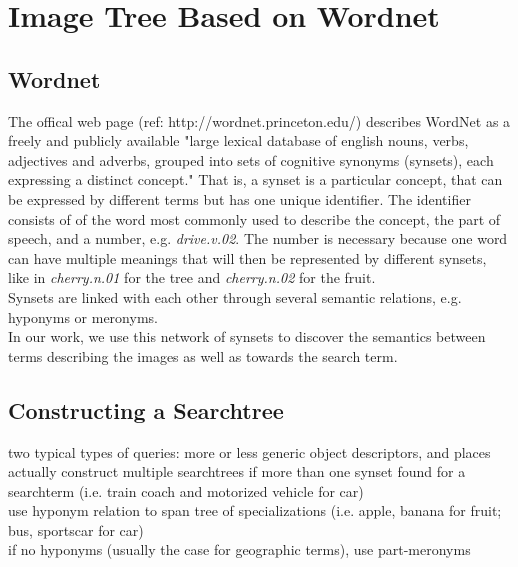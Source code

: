 %
\section{Image Tree Based on Wordnet}
\label{sec_wordnetsearchtree}

\subsection{Wordnet}
The offical web page (ref: http://wordnet.princeton.edu/) describes WordNet as a freely and publicly available "large lexical database of english nouns, verbs, adjectives and adverbs, grouped into sets of cognitive synonyms (synsets), each expressing a distinct concept." That is, a synset is a particular concept, that can be expressed by different terms but has one unique identifier. The identifier consists of of the word most commonly used to describe the concept, the part of speech, and a number, e.g. \emph{drive.v.02}.
The number is necessary because one word can have multiple meanings that will then be represented by different synsets, like in \emph{cherry.n.01} for the tree and \emph{cherry.n.02} for the fruit. \\

Synsets are linked with each other through several semantic relations, e.g. hyponyms or meronyms. \\
In our work, we use this network of synsets to discover the semantics between terms describing the images as well as towards the search term. \\
  

\subsection{Constructing a Searchtree}
two typical types of queries: more or less generic object descriptors, and places \\
actually construct multiple searchtrees if more than one synset found for a searchterm (i.e. train coach and motorized vehicle for car)\\
use hyponym relation to span tree of specializations (i.e. apple, banana for fruit; bus, sportscar for car)\\
if no hyponyms (usually the case for geographic terms), use part-meronyms\\

